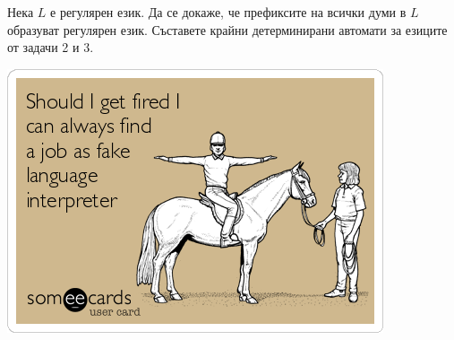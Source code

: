 \documentclass{exam}
\begin{document}
\begin{questions}
\question Нека $L$ е регулярен език. Да се докаже, че префиксите на всички думи в $L$ образуват регулярен език.
\question Съставете крайни детерминирани автомати за езиците от задачи 2 и 3.
\end{questions}
\includegraphics[scale=0.5]{eai}
\end{document}
